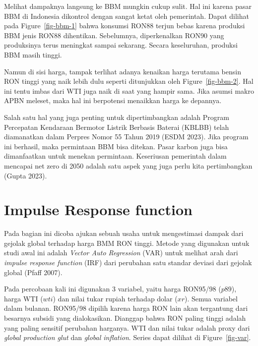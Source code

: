\documentclass[
  a4paper,
  DIV=11,
  numbers=noendperiod]{scrreprt}
\begin{document}
Melihat dampaknya langsung ke BBM mungkin cukup sulit. Hal ini karena
pasar BBM di Indonesia dikontrol dengan sangat ketat oleh pemerintah.
Dapat dilihat pada Figure~\ref{fig-bbm-1} bahwa konsumsi RON88 terjun
bebas karena produksi BBM jenis RON88 dihentikan. Sebelumnya,
diperkenalkan RON90 yang produksinya terus meningkat sampai sekarang.
Secara keseluruhan, produksi BBM masih tinggi.

Namun di sisi harga, tampak terlihat adanya kenaikan harga terutama
bensin RON tinggi yang naik lebih dulu seperti ditunjukkan oleh
Figure~\ref{fig-bbm-2}. Hal ini tentu imbas dari WTI juga naik di saat
yang hampir sama. Jika asumsi makro APBN meleset, maka hal ini
berpotensi menaikkan harga ke depannya.

Salah satu hal yang juga penting untuk dipertimbangkan adalah Program
Percepatan Kendaraan Bermotor Listrik Berbasis Baterai (KBLBB) telah
diamanatkan dalam Perpres Nomor 55 Tahun 2019 (ESDM 2023). Jika program
ini berhasil, maka permintaan BBM bisa ditekan. Pasar karbon juga bisa
dimanfaatkan untuk menekan permintaan. Keseriusan pemerintah dalam
mencapai net zero di 2050 adalah satu aspek yang juga perlu kita
pertimbangkan (Gupta 2023).

\hypertarget{impulse-response-function}{%
\section{Impulse Response function}\label{impulse-response-function}}

Pada bagian ini dicoba ajukan sebuah usaha untuk mengestimasi dampak
dari gejolak global terhadap harga BMM RON tinggi. Metode yang digunakan
untuk studi awal ini adalah \emph{Vector Auto Regression} (VAR) untuk
melihat arah dari \emph{impulse response function} (IRF) dari perubahan
satu standar deviasi dari gejolak global (Pfaff 2007).

Pada percobaan kali ini digunakan 3 variabel, yaitu harga RON95/98
(\(p89\)), harga WTI (\(wti\)) dan nilai tukar rupiah terhadap dolar
(\(xr\)). Semua variabel dalam bulanan. RON95/98 dipilih karena harga
RON lain akan tergantung dari besarnya subsidi yang dialokasikan.
Dianggap bahwa RON paling tinggi adalah yang paling sensitif perubahan
harganya. WTI dan nilai tukar adalah proxy dari \emph{global production
glut} dan \emph{global inflation}. Series dapat dilihat di
Figure~\ref{fig-var}.
\end{document}
